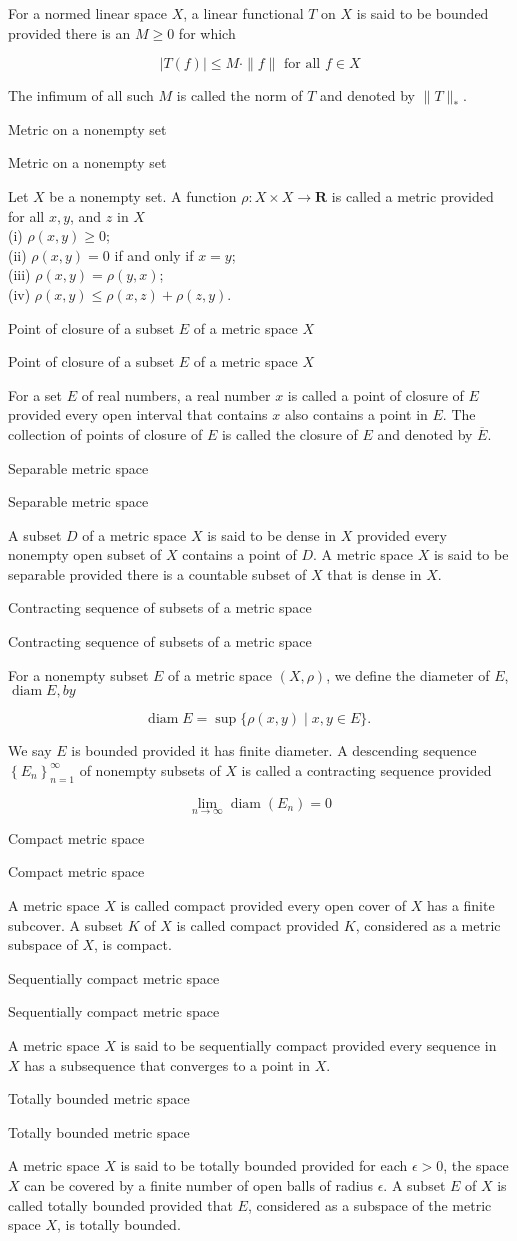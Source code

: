 \documentclass[17pt]{extarticle}
\renewcommand{\bar}[1]{\overline{#1}}
\newcommand{\boxset}[2]{\begin{mdframed}[style=darkQuesion]
#1
\end{mdframed}
\newpage
\begin{mdframed}[style=darkQuesion]
#1
  \end{mdframed}
\begin{mdframed}[style=darkAnswer]
#2
  \end{mdframed}
  \newpage
}
\begin{document}
{
For a normed linear space $X$, a linear functional $T$ on $X$ is said to be bounded provided there is an $M \geq 0$ for which

\[
|T(f)| \leq M \cdot\|f\| \text { for all } f \in X
\]

The infimum of all such $M$ is called the norm of $T$ and denoted by $\|T\|_{*}$.
}
\boxset{Metric on a nonempty set}
{
Let $X$ be a nonempty set. A function $\rho: X \times X \rightarrow \mathbf{R}$ is called a metric provided for all $x, y$, and $z$ in $X$\[\ \]
(i) $\rho(x, y) \geq 0$;\[\ \]
(ii) $\rho(x, y)=0$ if and only if $x=y$;\[\ \]
(iii) $\rho(x, y)=\rho(y, x)$;\[\ \]
(iv) $\rho(x, y) \leq \rho(x, z)+\rho(z, y)$.
}
\boxset{Point of closure of a subset $E$ of a metric space $X$}
{
For a set $E$ of real numbers, a real number $x$ is called a point of closure of $E$ provided every open interval that contains $x$ also contains a point in $E$. The collection of points of closure of $E$ is called the closure of $E$ and denoted by $\bar{E}$.
}
\boxset{Separable metric space}
{
A subset $D$ of a metric space $X$ is said to be dense in $X$ provided every nonempty open subset of $X$ contains a point of $D$. A metric space $X$ is said to be separable provided there is a countable subset of $X$ that is dense in $X$.
}
\boxset{Contracting sequence of subsets of a metric space}
{
For a nonempty subset $E$ of a metric space $(X, \rho)$, we define the diameter of $E$, $\operatorname{diam} E, b y$

\[
\operatorname{diam} E=\sup \{\rho(x, y) \mid x, y \in E\} \text {. }
\]

We say $E$ is bounded provided it has finite diameter. A descending sequence $\left\{E_{n}\right\}_{n=1}^{\infty}$ of nonempty subsets of $X$ is called a contracting sequence provided

\[
\lim _{n \rightarrow \infty} \operatorname{diam}\left(E_{n}\right)=0
\]

}
\boxset{Compact metric space}
{
A metric space $X$ is called compact provided every open cover of $X$ has a finite subcover. A subset $K$ of $X$ is called compact provided $K$, considered as a metric subspace of $X$, is compact.
}
\boxset{Sequentially compact metric space}
{
A metric space $X$ is said to be sequentially compact provided every sequence in $X$ has a subsequence that converges to a point in $X$.
}
\boxset{Totally bounded metric space}
{
A metric space $X$ is said to be totally bounded provided for each $\epsilon>0$, the space $X$ can be covered by a finite number of open balls of radius $\epsilon.$ A subset $E$ of $X$ is called totally bounded provided that $E$, considered as a subspace of the metric space $X$, is totally bounded.
}
\end{document}
